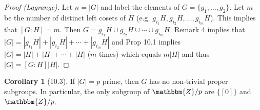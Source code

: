 \documentclass{article}
\newcommand{\Z}{\mathbbm{Z}}
\newcommand{\union}{\cup}
\theoremstyle{definition}
\newtheorem*{cor}{Corollary}
\theoremstyle{remark}
\begin{document}
{{            \begin{proof}[Proof (Lagrange)]
                Let $n=|G|$ and label the elements of $G=\{g_1,\ldots,g_2\}$. Let $m$ be the number of distinct left cosets of $H$ (e.g. $g_{i_1}H,g_{i_2}H,\ldots,g_{i_m}H$). This implies that $[G:H]=m$. Then $G=g_{i_1}H\union g_{i_2}H\union \cdots\union g_{i_m}H$. Remark 4 implies that $|G|=|g_{i_1}H|+|g_{i_2}H|+\cdots+|g_{i_m}H|$ and Prop 10.1 implies $|G|=|H|+|H|+\cdots+|H|$ ($m$ times) which equals $m|H|$ and thus $|G|=[G:H]|H|$.
            \end{proof}
            
            \begin{cor}[10.3]
                If $|G|=p$ prime, then $G$ has no non-trivial proper subgroups. In particular, the only subgroup of $\Z/p$ are $\{[0]\}$ and $\Z/p$.
            \end{cor}
        
        
        }
    }
    
\end{document}
